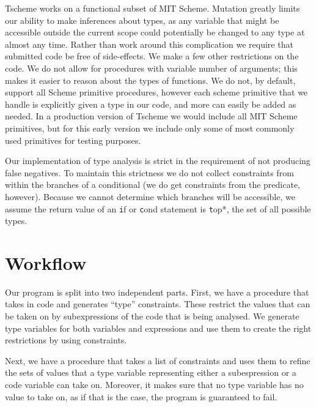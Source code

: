 \documentclass[a4paper]{article}
\begin{document}
Tscheme works on a functional subset of MIT Scheme.  Mutation greatly limits 
our ability to make inferences about types, as any variable that might be 
accessible outside the current scope could potentially be changed to any type 
at almost any time.  Rather than work around this complication we require that
submitted code be free of side-effects.  We make a few other restrictions on 
the code.  We do not allow for procedures with variable number of arguments;
this makes it easier to reason about the types of functions.  We do not, by 
default, support all Scheme primitive procedures, however each scheme 
primitive that we handle is explicitly given a type in our code, and more can 
easily be added as needed.  In a production version of Tscheme we would 
include all MIT Scheme primitives, but for this early version we include only 
some of most commonly used primitives for testing purposes.

Our implementation of type analysis is strict in the requirement of not producing 
false negatives.  To maintain this strictness we do not collect constraints 
from within the branches of a conditional (we do get constraints from the 
predicate, however).  Because we cannot determine which branches will be 
accessible, we assume the return value of an {\texttt if} or {\texttt cond}
statement is {\texttt *top*}, the set of all possible types.


\section{Workflow}

Our program is split into two independent parts.
First, we have a procedure that takes in code and generates ``type'' constraints.
These restrict the values that can be taken on by subexpressions of the
code that is being analysed.
We generate type variables for both variables and expressions
and use them to create the right restrictions by using constraints.

Next, we have a procedure that takes a list of constraints and uses them to
refine the sets of values that a type variable representing either a subespression
or a code variable can take on.
Moreover, it makes sure that no type variable has no value to take on,
as if that is the case, the program is guaranteed to fail.
\end{document}
